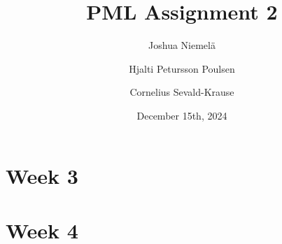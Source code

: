 \documentclass{article}
\begin{document}
\title{PML Assignment 2}
\author{
  Joshua Niemelä
  \and
  Hjalti Petursson Poulsen
  \and
  Cornelius Sevald-Krause
}
\date{December 15th, 2024}
\maketitle

\section{Week 3}


\section{Week 4}


\appendix

\end{document}

